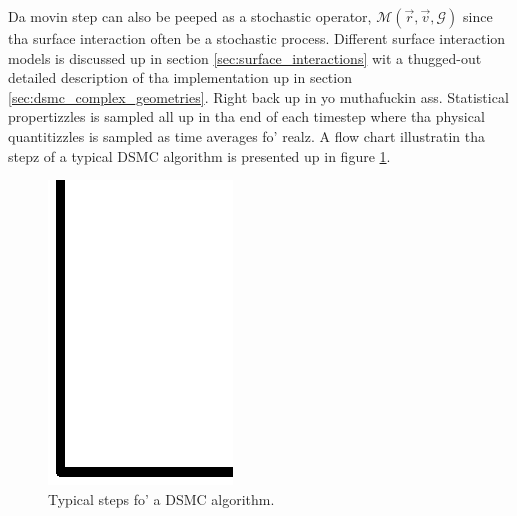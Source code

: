 Da movin step can also be peeped as a stochastic operator, $\mathcal{M}(\vec r, \vec v, \mathcal{G})$ since tha surface interaction often be a stochastic process. Different surface interaction models is discussed up in section \ref{sec:surface_interactions} wit a thugged-out detailed description of tha implementation up in section \ref{sec:dsmc_complex_geometries}. Right back up in yo muthafuckin ass. Statistical propertizzles is sampled all up in tha end of each timestep where tha physical quantitizzles is sampled as time averages fo' realz. A flow chart illustratin tha stepz of a typical DSMC algorithm is presented up in figure \ref{fig:dsmc_flowchart}.
\begin{figure}[ht]
\begin{center}
\includegraphics[width=\textwidth, trim=0cm 0cm 0cm 0cm, clip]{DSMC/figures/dsmc_flowchart.eps}
\end{center}
\caption{Typical steps fo' a DSMC algorithm.}
\label{fig:dsmc_flowchart}
\end{figure}

